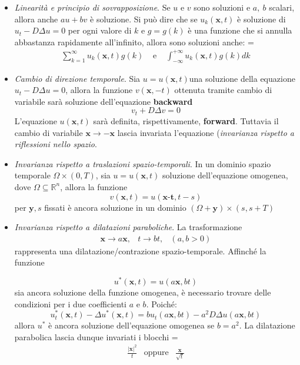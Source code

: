 \documentclass[a4paper,12pt, draft]{article}
\theoremstyle{break}
\numberwithin{equation}{section}
\begin{document}
\begin{itemize}
\item \textit{Linearità e principio di sovrapposizione}.
Se $u$ e $v$ sono soluzioni e $a, \ b$ scalari, allora anche $au+bv$ è soluzione.  
Si può dire che se $u_k(\bm{x},t)$ è soluzione di $u_t-D\Delta u = 0$ per ogni valore di $k$ e $g=g(k)$ è una funzione che si annulla abbastanza rapidamente all'infinito, allora sono soluzioni anche:
{ 
\everymath={\displaystyle}
$$\begin{array}{lcr}

\sum_{k=1}^{\infty}u_k(\bm{x},t)g(k) & \mbox{ e } & \int_{-\infty}^{+\infty} u_k(\bm{x},t)g(k)dk


\end{array}
$$
}
\item \emph{Cambio di direzione temporale}. Sia $u = u(\bm{x}, t)$una soluzione della equazione $u_t - D\Delta u = 0$, allora la funzione $v(\bm{x},-t)$ ottenuta tramite cambio di variabile sarà soluzione dell'equazione \textbf{backward}
$$v_t + D\Delta v = 0$$
L'equazione $u(\bm{x}, t)$ sarà definita, rispettivamente, \textbf{forward}. Tuttavia il cambio di variabile $\bm{x} \to -\bm{x}$ lascia invariata l'equazione (\emph{invarianza rispetto a riflessioni nello spazio}.
\item \emph{Invarianza rispetto a traslazioni spazio-temporali}.
In un dominio spazio temporale $\Omega \times (0, T)$, sia $u = u(\bm{x}, t)$ soluzione dell'equazione omogenea, dove $\Omega \subseteq \mathbb{R}^n$, allora la funzione 
$$ v(\bm{x}, t) = u(\mathbf{x \mbox{-} t}, t-s)$$
per $\bm{y}, s$ fissati è ancora soluzione in un dominio $(\Omega + \bm{y}) \times (s, s+ T)$
\item \emph{Invarianza rispetto a dilatazioni paraboliche}. La trasformazione 
$$
\begin{array}{ccc}
\bm{x} \to a \bm{x}, & t \to bt, & (a, b >0)

\end{array}
$$
rappresenta una dilatazione/contrazione spazio-temporale.  
Affinché la funzione

$$
u^*(\bm{x},t) = u(a\bm{x},bt)
$$
sia ancora soluzione della funzione omogenea, è necessario trovare delle condizioni per i due coefficienti $a \mbox{ e }b$.
Poiché:
$$ 
u_t^*(\bm{x},t)-\Delta u^* (\bm{x},t) = bu_t(a\bm{x},bt)-a^2D\Delta u(a\bm{x}, bt)
$$
allora $u^*$ è ancora soluzione dell'equazione omogenea se $b = a^2$. La dilatazione parabolica lascia dunque invariati i blocchi 
{\everymath = {\displaystyle}
$$
\begin{array}{lcr}
\frac{|\bm{x}|^2}{t}& \mbox{oppure} & \frac{\bm{x}}{\sqrt{t}}

\end{array}
$$
}
\end{itemize}
\end{document}
